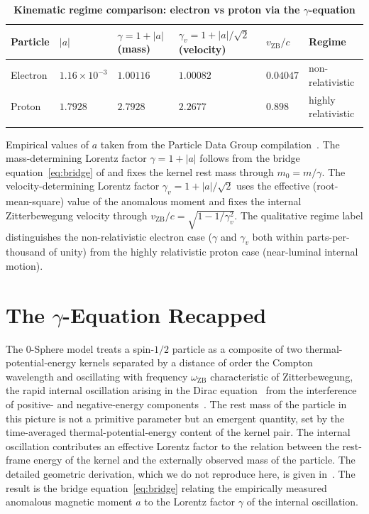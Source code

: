 \documentclass[%
 reprint, amsmath,amssymb, aps, prc, ]{revtex4-2}
\numberwithin{equation}{section}
\newcommand{\omZB}{\omega_{\text{ZB}}}
\newcommand{\vZB}{v_{\text{ZB}}}
\begin{document}
\begin{table}[t!]
\centering
\caption{\textbf{Kinematic regime comparison: electron vs proton via the $\gamma$-equation}}
\label{tab:e_vs_p}
\renewcommand{\arraystretch}{1.4}
\begin{tabular}{p{2.3cm}p{2.3cm}p{2.7cm}p{2.7cm}p{2.0cm}p{2.6cm}}
\toprule
\textbf{Particle} & \textbf{$|a|$} & \textbf{$\gamma = 1+|a|$ (mass)} & \textbf{$\gamma_v = 1+|a|/\sqrt{2}$ (velocity)} & \textbf{$\vZB / c$} & \textbf{Regime} \\
\midrule
Electron
& $1.16 \times 10^{-3}$
& $1.00116$
& $1.00082$
& $0.04047$
& non-relativistic \\
\addlinespace[0.3cm]
Proton
& $1.7928$
& $2.7928$
& $2.2677$
& $0.898$
& highly relativistic \\
\addlinespace[0.2cm]
\bottomrule
\end{tabular}
\vspace{0.2cm}
\begin{minipage}{0.95\textwidth}
\justifying\footnotesize
Empirical values of $a$ taken from the Particle Data Group compilation~\cite{PDG}.
The mass-determining Lorentz factor $\gamma = 1 + |a|$ follows from the bridge equation~\eqref{eq:bridge} of \cite{Hanamura10} and fixes the kernel rest mass through $m_0 = m/\gamma$.
The velocity-determining Lorentz factor $\gamma_v = 1 + |a|/\sqrt{2}$ uses the effective (root-mean-square) value of the anomalous moment and fixes the internal Zitterbewegung velocity through $\vZB / c = \sqrt{1 - 1/\gamma_v^2}$.
The qualitative regime label distinguishes the non-relativistic electron case ($\gamma$ and $\gamma_v$ both within parts-per-thousand of unity) from the highly relativistic proton case (near-luminal internal motion).
\end{minipage}
\end{table}

\section{The $\gamma$-Equation Recapped}
\label{sec:gammaeq}

The 0-Sphere model treats a spin-$1/2$ particle as a composite of two thermal-potential-energy kernels separated by a distance of order the Compton wavelength and oscillating with frequency $\omZB$ characteristic of Zitterbewegung, the rapid internal oscillation arising in the Dirac equation~\cite{Dirac1928} from the interference of positive- and negative-energy components~\cite{Schrodinger1930}.
The rest mass of the particle in this picture is not a primitive parameter but an emergent quantity, set by the time-averaged thermal-potential-energy content of the kernel pair.
The internal oscillation contributes an effective Lorentz factor to the relation between the rest-frame energy of the kernel and the externally observed mass of the particle.
The detailed geometric derivation, which we do not reproduce here, is given in~\cite{Hanamura10}.
The result is the bridge equation~\eqref{eq:bridge} relating the empirically measured anomalous magnetic moment $a$ to the Lorentz factor $\gamma$ of the internal oscillation.
\end{document}
